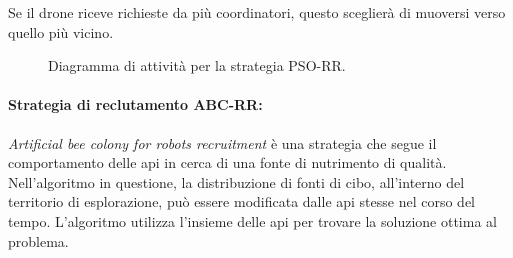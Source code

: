 Se il drone riceve richieste da più coordinatori, questo sceglierà di muoversi verso quello più vicino.

\begin{figure}[H] 
    \captionsetup{justification=centering, margin=2cm, font=footnotesize}
    \begin{center}
    \end{center}
    \caption{Diagramma di attività per la strategia PSO-RR.}
    \label{attivita_pso}
\end{figure}

\paragraph{Strategia di reclutamento ABC-RR:} \textit{Artificial bee colony for robots recruitment} è una strategia che segue il comportamento delle api in cerca di una fonte di nutrimento di qualità. 
Nell’algoritmo in questione, la distribuzione di fonti di cibo, all’interno del territorio di esplorazione, può essere modificata dalle api stesse nel corso del tempo. 
L’algoritmo utilizza l’insieme delle api per trovare la soluzione ottima al problema. 

